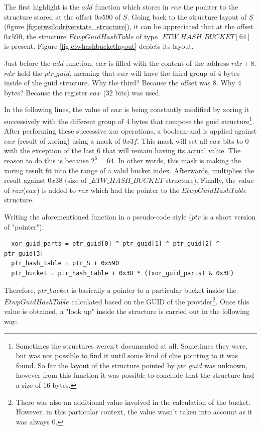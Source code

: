   The first highlight is the $add$ function which stores in $rcx$ the pointer to the structure stored at the offset $0x590$ of $S$. Going back to the structure layout of $S$ (figure \ref{fig:etwsilodriverstate_structure}), it can be appreciated that at the offset $0x590$, the structure $EtwpGuidHashTable$ of type $\_ETW\_HASH\_BUCKET[64]$ is present. Figure \ref{fig:etwhashbucketlayout} depicts its layout.

  Just before the $add$ function, $eax$ is filled with the content of the address $rdx+8$. $rdx$ held the $ptr\_guid$, meaning that $eax$ will have the third group of 4 bytes inside of the guid structure. Why the third? Because the offset was 8. Why 4 bytes? Because the register $eax$ (32 bits) was used.

  In the following lines, the value of $eax$ is being constantly modified by xoring it successively with the different group of 4 bytes that compose the guid structure\footnote{Sometimes the structures weren't documented at all. Sometimes they were, but was not possible to find it until some kind of clue pointing to it was found.  So far the layout of the structure pointed by $ptr\_guid$ was unknown, however from this function it was possible to conclude that the structure had a size of 16 bytes.}. After performing these successive xor operations, a boolean-and is applied against $eax$ (result of xoring) using a mask of $0x3f$. This mask will set all $eax$ bits to 0 with the exception of the last 6 that will remain having its actual value. The reason to do this is because $2^6 = 64$. In other words, this mask is making the xoring result fit into the range of a valid bucket index. Afterwards, multiplies the result against $0x38$ (size of $\_ETW\_HASH\_BUCKET$ structure). Finally, the value of $rax$($eax$) is added to $rcx$ which had the pointer to the $EtwpGuidHashTable$ structure. 

  Writing the aforementioned function in a pseudo-code style ($ptr$ is a short version of "pointer"): 
  \begin{verbatim}
  xor_guid_parts = ptr_guid[0] ^ ptr_guid[1] ^ ptr_guid[2] ^ ptr_guid[3]
  ptr_hash_table = ptr_S + 0x590
  ptr_bucket = ptr_hash_table + 0x38 * ((xor_guid_parts) & 0x3F) 
  \end{verbatim}

  Therefore, $ptr\_bucket$ is basically a pointer to a particular bucket inside the $EtwpGuidHashTable$ calculated based on the GUID of the provider\footnote{There was also an additional value involved in the calculation of the bucket. However, in this particular context, the value wasn't taken into account as it was always 0. }. 
  Once this value is obtained, a "look up" inside the structure is carried out in the following way:


